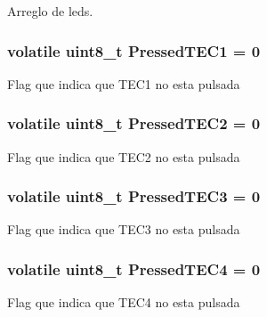 Arreglo de leds. 

\subsubsection[{\texorpdfstring{Pressed\+T\+E\+C1}{PressedTEC1}}]{\setlength{\rightskip}{0pt plus 5cm}volatile uint8\+\_\+t Pressed\+T\+E\+C1 = 0}\hypertarget{group__operaciones_gadada3867f506ba726c6c12a71b397621}{}\label{group__operaciones_gadada3867f506ba726c6c12a71b397621}
Flag que indica que T\+E\+C1 no esta pulsada 
\subsubsection[{\texorpdfstring{Pressed\+T\+E\+C2}{PressedTEC2}}]{\setlength{\rightskip}{0pt plus 5cm}volatile uint8\+\_\+t Pressed\+T\+E\+C2 = 0}\hypertarget{group__operaciones_gaadec03bea3938c2760f06ffd88e33b94}{}\label{group__operaciones_gaadec03bea3938c2760f06ffd88e33b94}
Flag que indica que T\+E\+C2 no esta pulsada 
\subsubsection[{\texorpdfstring{Pressed\+T\+E\+C3}{PressedTEC3}}]{\setlength{\rightskip}{0pt plus 5cm}volatile uint8\+\_\+t Pressed\+T\+E\+C3 = 0}\hypertarget{group__operaciones_ga56c006b4c8f511fc9949e3c7a8a0eb84}{}\label{group__operaciones_ga56c006b4c8f511fc9949e3c7a8a0eb84}
Flag que indica que T\+E\+C3 no esta pulsada 
\subsubsection[{\texorpdfstring{Pressed\+T\+E\+C4}{PressedTEC4}}]{\setlength{\rightskip}{0pt plus 5cm}volatile uint8\+\_\+t Pressed\+T\+E\+C4 = 0}\hypertarget{group__operaciones_ga6436d6c08f548b81935197984bbcd720}{}\label{group__operaciones_ga6436d6c08f548b81935197984bbcd720}
Flag que indica que T\+E\+C4 no esta pulsada 
